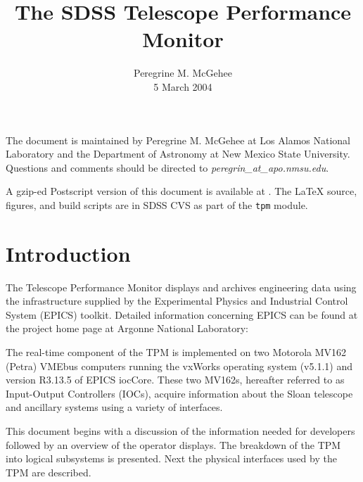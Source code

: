 \documentclass[preprint]{aastex}
\begin{document}

\title{The SDSS Telescope Performance Monitor}

\author{Peregrine M. McGehee\\5 March 2004}

The document is maintained by Peregrine M. McGehee at Los Alamos
National Laboratory and the Department of Astronomy at New Mexico
State University. Questions and comments should be directed to
{\it peregrin\_at\_apo.nmsu.edu}.

A gzip-ed Postscript version of this document is available at
. 
The \LaTeX{} source, figures, and build scripts are in SDSS CVS
as part of the {\tt tpm} module. 


\section{Introduction}
The Telescope Performance Monitor displays and archives engineering data
using the infrastructure supplied by the Experimental Physics and 
Industrial Control System (EPICS) toolkit.
Detailed information concerning EPICS can be found at the project home
page at Argonne National Laboratory:

The real-time component of the TPM is implemented on two Motorola 
MV162 (Petra) VMEbus computers running the vxWorks operating system 
(v5.1.1) and version R3.13.5 of EPICS iocCore. These two MV162s, 
hereafter referred to as Input-Output Controllers (IOCs), acquire 
information about the Sloan telescope and ancillary systems using a variety of interfaces. 

This document begins with a discussion of the information needed
for developers followed by an overview of the operator displays.
The breakdown of the TPM into logical subsystems is presented. Next the
physical interfaces used by the TPM are described.
\end{document}
